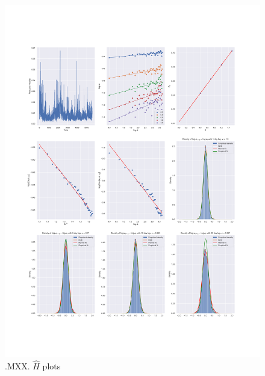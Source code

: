 	\begin{figure}[h]
		\centering
		\includegraphics[width=\linewidth]{fig/.MXX.pdf}
		\caption{.MXX. $\hat{H}$ plots}
	\end{figure}


